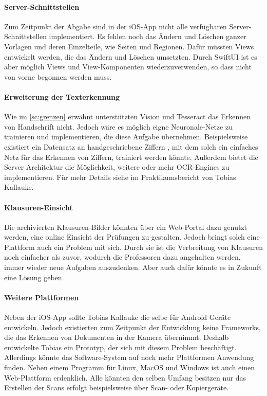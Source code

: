 \documentclass[notables, nomenclature, oneside, 150]{HSMW-Thesis}
\begin{document}
	\paragraph*{Server-Schnittstellen} 
		Zum Zeitpunkt der Abgabe sind in der iOS-App nicht alle verfügbaren Server-Schnittstellen implementiert. Es fehlen noch das Ändern und Löschen ganzer Vorlagen und deren Einzelteile, wie Seiten und Regionen. Dafür müssten Views entwickelt werden, die das Ändern und Löschen umsetzten. Durch SwiftUI ist es aber möglich Views und View-Komponenten wiederzuverwenden, so dass nicht von vorne begonnen werden muss. 		
	
	\paragraph*{Erweiterung der Texterkennung} 
		Wie im \autoref{sc:grenzen} erwähnt unterstützten Vision und Tesseract das Erkennen von Handschrift nicht. Jedoch wäre es möglich eigne Neuronale-Netze zu trainieren und implementieren, die diese Aufgabe übernehmen. Beispielsweise existiert ein Datensatz an handgeschriebene Ziffern , mit dem solch ein einfaches Netz für das Erkennen von Ziffern, trainiert werden könnte. Außerdem bietet die Server Architektur die Möglichkeit, weitere oder mehr OCR-Engines zu implementieren. Für mehr Details siehe im Praktikumsbericht von Tobias Kallauke.
	
	\paragraph*{Klausuren-Einsicht} 
		Die archivierten Klausuren-Bilder könnten über ein Web-Portal dazu genutzt werden, eine online Einsicht der Prüfungen zu gestalten. Jedoch bringt solch eine Plattform auch ein Problem mit sich. Durch sie ist die Verbreitung von Klausuren noch einfacher als zuvor, wodurch die Professoren dazu angehalten werden, immer wieder neue Aufgaben auszudenken. Aber auch dafür könnte es in Zukunft eine Lösung geben. 
	
	\paragraph*{Weitere Plattformen} 
		Neben der iOS-App sollte Tobias Kallauke die selbe für Android Geräte entwickeln. Jedoch existierten zum Zeitpunkt der Entwicklung keine Frameworks, die das Erkennen von Dokumenten in der Kamera übernimmt. Deshalb entwickelte Tobias ein Prototyp, der sich mit diesem Problem beschäftigt. Allerdings könnte das Software-System auf noch mehr Plattformen Anwendung finden. Neben einem Programm für Linux, MacOS und Windows ist auch einen Web-Plattform  erdenklich. Alle könnten den selben Umfang besitzen nur das Erstellen der Scans erfolgt beispielsweise über Scan- oder Kopiergeräte.
	
\end{document}
